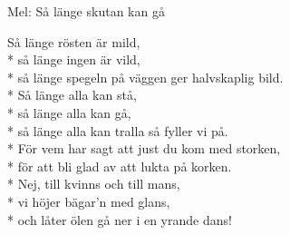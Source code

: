 \begin{SongText}
    \begin{SongInfo}
        Mel: Så länge skutan kan gå
    \end{SongInfo}
    \begin{SongVerse}
        Så länge rösten är mild,\\*%
        så länge ingen är vild,\\*%
        så länge spegeln på väggen ger halvskaplig bild.\\*%
        Så länge alla kan stå,\\*%
        så länge alla kan gå,\\*%
        så länge alla kan tralla så fyller vi på.\\*%
        För vem har sagt att just du kom med storken,\\*%
        för att bli glad av att lukta på korken.\\*%
        Nej, till kvinns och till mans,\\*%
        vi höjer bägar'n med glans,\\*%
        och låter ölen gå ner i en yrande dans!
    \end{SongVerse}
\end{SongText}
